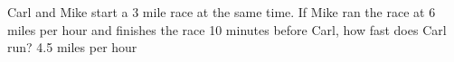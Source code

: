 {Carl and Mike start a 3 mile race at the same time.  If Mike ran the race at 6 miles per hour and finishes the race 10 minutes before Carl, how fast does Carl run?}
{4.5 miles per hour}